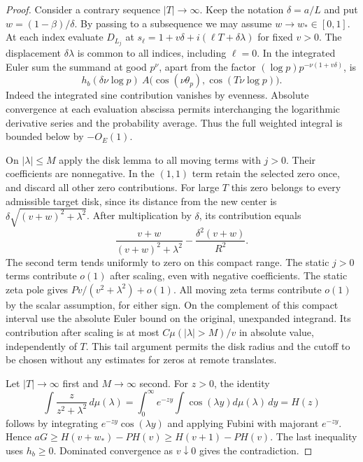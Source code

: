 \documentclass[11pt]{article}
\begin{document}
\begin{proof}
Consider a contrary sequence $|T|\to\infty$. Keep the notation $\delta=a/L$ and put $w=(1-\beta)/\delta$. By passing to a subsequence we may assume $w\to w_*\in[0,1]$. At each index evaluate $D_{L_j}$ at $s_\ell=1+v\delta+i(\ell T+\delta\lambda)$ for fixed $v>0$. The displacement $\delta\lambda$ is common to all indices, including $\ell=0$. In the integrated Euler sum the summand at good $p^\nu$, apart from the factor $(\log p)p^{-\nu(1+v\delta)}$, is
\[
 h_b(\delta\nu\log p)\ A\big(\cos(\nu\theta_p),\cos(T\nu\log p)\big).
\]
Indeed the integrated sine contribution vanishes by evenness. Absolute convergence at each evaluation abscissa permits interchanging the logarithmic derivative series and the probability average. Thus the full weighted integral is bounded below by $-O_E(1)$.

On $|\lambda|\le M$ apply the disk lemma to all moving terms with $j>0$. Their coefficients are nonnegative. In the $(1,1)$ term retain the selected zero once, and discard all other zero contributions. For large $T$ this zero belongs to every admissible target disk, since its distance from the new center is $\delta\sqrt{(v+w)^2+\lambda^2}$. After multiplication by $\delta$, its contribution equals
\[
 \frac{v+w}{(v+w)^2+\lambda^2}
            -\frac{\delta^2(v+w)}{R^2}.
\]
The second term tends uniformly to zero on this compact range. The static $j>0$ terms contribute $o(1)$ after scaling, even with negative coefficients. The static zeta pole gives $P v/(v^2+\lambda^2)+o(1)$. All moving zeta terms contribute $o(1)$ by the scalar assumption, for either sign. On the complement of this compact interval use the absolute Euler bound on the original, unexpanded integrand. Its contribution after scaling is at most $C\mu(|\lambda|>M)/v$ in absolute value, independently of $T$. This tail argument permits the disk radius and the cutoff to be chosen without any estimates for zeros at remote translates.

Let $|T|\to\infty$ first and $M\to\infty$ second. For $z>0$, the identity
\[
 \int\frac z{z^2+\lambda^2}\,d\mu(\lambda)
    =\int_0^\infty e^{-zy}\int\cos(\lambda y)d\mu(\lambda)\,dy=H(z)
\]
follows by integrating $e^{-zy}\cos(\lambda y)$ and applying Fubini with majorant $e^{-zy}$. Hence $aG\ge H(v+w_*)-PH(v)\ge H(v+1)-PH(v)$. The last inequality uses $h_b\ge0$. Dominated convergence as $v\downarrow0$ gives the contradiction.
\end{proof}
\end{document}

